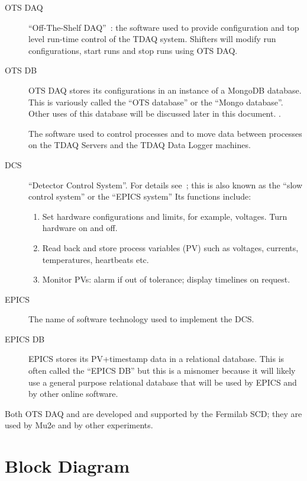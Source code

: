 \begin{description}
\item[OTS DAQ] ``Off-The-Shelf DAQ''~\cite{MU2EOTSDAQ}: the software used to provide configuration and top level run-time control of the TDAQ system.
  Shifters will modify run configurations, start runs and stop runs using OTS DAQ.
\item[OTS DB] OTS DAQ stores its configurations in an instance of a MongoDB database.  This is variously called the ``OTS database'' or the ``Mongo database''.
  Other uses of this database will be discussed later in this document. .
\item[\artdaq] The software used to control processes and to move data between processes on the TDAQ Servers and the TDAQ Data Logger machines.
\item[DCS] ``Detector Control System''.
  For details see~\cite{DCSSpec};
  this is also known as the ``slow control system'' or the ``EPICS system''
  Its functions include:
  \begin{enumerate}
    \item Set hardware configurations and limits, for example, voltages.  Turn hardware on and off.
    \item Read back and store process variables (PV) such as voltages, currents, temperatures, heartbeats etc.
    \item Monitor PVs: alarm if out of tolerance; display timelines on request.
  \end{enumerate}
\item[EPICS] The name of software technology used to implement the DCS.
\item[EPICS DB] EPICS stores its PV+timestamp data in a relational database.
  This is often called the ``EPICS DB'' but this is a misnomer because it will likely use
  a general purpose relational database that will be used by EPICS
  and by other online software.
\end{description}
Both OTS DAQ and \artdaq are developed and supported by the Fermilab SCD;
they are used by Mu2e and by other experiments.


\section{Block Diagram}
\label{sec:BlockDiagram}


